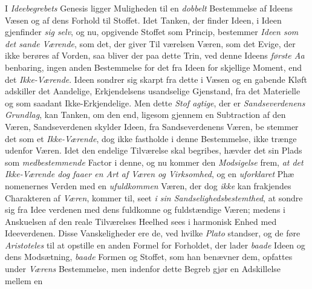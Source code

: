 I \emph{Ideebegrebets} Genesis ligger Muligheden til en
\emph{dobbelt} Bestemmelse af Ideens Væsen og af dens Forhold
til Stoffet. Idet Tanken, der finder Ideen, i Ideen gjenfinder
\emph{sig selv}, og nu, opgivende Stoffet som Princip, bestemmer
\emph{Ideen som det sande Værende}, som det, der giver Til\-%
værelsen Væren, som det Evige, der ikke berøres af Vorden,
saa bliver der paa dette Trin, ved denne Ideens \emph{første Aa\-%
}benbaring, ingen anden Bestemmelse for det fra Ideen for\-%
skjellige Moment, end det \emph{Ikke-Værende}. Ideen sondrer
sig skarpt fra dette i Væsen og en gabende Kløft adskiller
det Aandelige, Erkjendelsens usandselige Gjenstand, fra det
Materielle og som saadant Ikke-Erkjendelige. Men dette \emph{Stof\-%
agtige}, der er \emph{Sandseverdenens Grundlag}, kan Tanken,
om den end, ligesom gjennem en Subtraction af den Væren,
Sandseverdenen skylder Ideen, fra Sandseverdenens Væren, be\-%
stemmer det som et \emph{Ikke-Værende}, dog ikke fastholde i
denne Bestemmelse, ikke trænge udenfor Væren. Idet den
endelige Tilværelse skal begribes, hævder det sin Plads som
\emph{medbestemmende} Factor i denne, og nu kommer den
\emph{Modsigelse} frem, \emph{at det Ikke-Værende dog faaer en
Art af Væren og Virksomhed}, og en \emph{uforklaret} Phæ\-%
nomenernes Verden med en \emph{ufuldkommen} Væren, der dog
\emph{ikke} kan frakjendes Charakteren af \emph{Væren}, kommer til, seet
\emph{i sin Sandselighedsbestemthed}, at sondre sig fra Idee\-%
verdenen med dens fuldkomne og fuldstændige Væren; medens
i Anskuelsen af  den reale Tilværelses Heelhed sees i
harmonisk Enhed med Ideeverdenen. Disse Vanskeligheder
ere de, ved hvilke \emph{Plato} standser, og de føre \emph{Aristoteles}
til at opstille en anden Formel for Forholdet, der lader \emph{baade}
Ideen og dens Modsætning, \emph{baade} Formen og Stoffet, som
han benævner dem, opfattes under \emph{Værens} Bestemmelse,
 \setcounter{footnote}{0}
men indenfor dette Begreb gjør en Adskillelse mellem en
